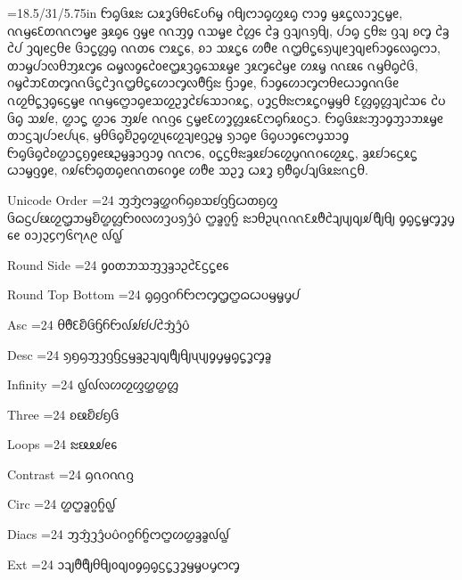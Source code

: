 






\sizes={18.5/31/5.75in}
\dotext ᦝᧂᦑᦸᦰ ᦍᦸᧆᦑᦲᧈᦷᦢᦆᧄ ᦅᧀᦂᦱᧂᦐᦸᧂ ᦂᦱᧁ ᦙᦸᧃᦟᦱᧆᦓᧄᧉ, ᦶᦙᧈᦷᦎᦶᦂᧄᧉ ᦃᦸᧂᧈ ᦋᧄᧉ ᦶᦀᧁ ᦵᦉᧄᧉ ᦺᦜᧈ ᦺᦃ ᦋᦻᦵᦣᧀ, ᦔᦱᧂ ᦓᦲᦰ ᦋᦻ ᦈᧅ ᦺᦃ ᦺᦔ ᦡᦽᧉᦓᦲᧉ ᦑᦱᧃᦜᧂ ᦶᦎᧈ ᦂᦸᧃᧈ, ᦈᦱ ᦉᦸᧃᧈ ᦠᦹᧉ ᦵᦗᦲᧃᧈᦣᦼᧉᦡᦽᧉᦆᦱᧁᧈᦟᧂᦂᦱ, ᦎᦱᧄᦔᦱᦟᦲᦀᦸᧅᧈ ᦒᧄᦟᧁᧈᦺᦞᧉᦗᦸᦡᧂᧈᦉᦸᧄᧉ ᦡᦸᧅᧈᦺᦙᧉ ᦠᦸᧄ ᦶᦕᧈ ᦵᦙᦲᧂᦺᦑ, ᦅᧄᦺᦘᦷᦎᧅᦶᦑᧃᦺᦡᦵᦗᦲᧃᧈᦠᦱᧅᦟᦹᦌᦰ ᦌᦱᧁᧉ, ᦆᦱᧁᧈᦠᦱᧅᦂᦲᧉᦍᦱᧁᦶᦑᧉ ᦵᦖᦲᧃᦡᧂᧈᦓᧄᧉ ᦶᦙᧈᦦᦱᧂᧉᦉᦖᦳᧆᦺᦊᧈᦉᦱᦅᦸᧃ, ᦢᧆᦓᦲᦰᦂᦸᧃᦅᧄᦙᦲ ᦷᦜᧂᦜᦻᦺᦉᧈ ᦺᦢ ᦑᧂ ᦉᦾᧉ, ᦛᦱᧃ ᦛᦱᧈ ᦀᦾᧉ ᦶᦋᧈ ᦓᧄᧉᦷᦠᧆᦜᦸᧈᦷᦂᧂᦆᦸᦞᦓᦱ. ᦝᧂᦑᦸᦰᦀᦱᧁᦀᦱᦘᦸᧄᧉ ᦎᦱᦓᦻᦔᦱᧉᦔᦴᧈ, ᦙᦲᦑᧂᦚᦳᧂᦖᦴᧈᦖᦻᧉᦋᦳᧄ ᦣᦱᧂᧉ ᦑᧂᦢᦱᧁᧈᦂᧇᦉᦱᧁ ᦝᧂᦑᧂᦺᦈᦛᦱᧃᦏᧁᧉᦕᦳᧄᦃᦱᦋᦱᧁ ᦶᦂᧈ, ᦞᧃᦓᦲᦰᦃᦸᦊᦱᧈᦖᧇᦶᦅᧈᦖᦸᧃ, ᦃᦸᦊᦱᧈᦓᦸᧃ ᦍᦱᧄᦋᧁᧉ, ᦅᦾᧈᦝᧂᦎᧂᧉᦶᦎᧈᦅᧁᧉ ᦠᦹᧉ ᦉᦳᧆ ᦍᦸᧆ ᦏᦹᧂᦔᦻᦑᦸᦰᦵᦓᦲ.

\eject

\dotext Unicode Order
\sizes={24}
\dotext ᦀᦁᦂᦃᦄᦅᦆᦇᦈᦉᦊᦋᦌᦍᦎᦏᦐ
\dotext ᦑᦒᦓᦔᦕᦖᦗᦘᦙᦚᦛᦜᦝᦞᦟᦠᦡᦢᦣᦤᦥ
\dotext ᦦᦧᦨᦩ
\dotext ᦰᦱᦲᦳᦴᦵᦶᦷᦸᦹᦺᦻᦼᦽᦾᦿᧀ
\dotext ᧁᧂᧃᧄᧅᧆᧇ
\dotext ᧈᧉ
\dotext ᧐᧑᧒᧓᧔᧕᧖᧗᧘᧙
\dotext ᧞᧟

\dotext Round Side
\sizes={24}
\dotext ᧁᦞᦎᦘᦉᦀᦡᦃᦱᦳᦺᦷᦓᧃᧉᧈ

\dotext Round Top Bottom
\sizes={24}
\dotext ᧂᦇᦋᦅᦆᦝᦂᧅᦗᦦᦒᦍᦢᦙᧄᧇᦔ

\dotext Asc
\sizes={24}
\dotext ᦲᦹᦷᦚᦑᦌᦆᦝ᧞ᦾᦊᦔᦺᦁᦤᦥ

\dotext Desc
\sizes={24}
\dotext ᦣᦏᦇᦀᦡᦋᦌᦓᦙᦃᦳᦻᦽᦿᧀᦴᦼᧁᧇᧄᧂᧃᧆᧅᦧ

\dotext Infinity
\sizes={24}
\dotext ᧟᧞ᦟᦠᦖᦐᦄᦛᦜ

\dotext Three
\sizes={24}
\dotext ᦈᦕᦚᦊᦏᦑ

\dotext Loops
\sizes={24}
\dotext ᦰᦕᦸᦾᧉᧈ

\dotext Contrast
\sizes={24}
\dotext ᦇᦵᦅᦶᦋ

\dotext Circ
\sizes={24}
\dotext ᦛᦦᦧᦨᦩ᧟

\dotext Diacs
\sizes={24}
\dotext ᦀᦁᦡᦤᦢᦥᦅᦨᦆᦩᦂᦦᦠᦛᦃᦧ᧞᧟

\dotext Ext
\sizes={24}
\dotext ᦱᦻᦹᦿᦲᧀᦞᦽᦞᧁᦇᧂᦓᧃᦡᧆᦙᧄᦢᧇᦂᧅ

